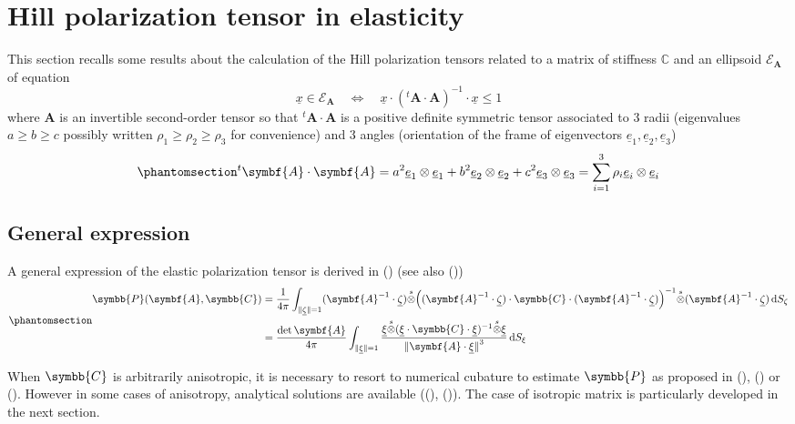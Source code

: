 \documentclass[
  a4paper,
  numbers=noendperiod,
  DIV=12]{scrreprt}
\newcommand{\uu}[1]{{\symbf{{#1}}}}
\newcommand{\uuuu}[1]{{\symbb{{#1}}}}
\newcommand{\uv}[1]{{\underline{{#1}}}}
\newcommand{\trans}[1]{{{}^{t}{#1}}}
\newcommand{\sotimes}{{\stackrel{s}{\otimes}}}
\newcommand{\norm}[1]{{\lVert{{#1}}\rVert}}
\newcommand{\ud}{{\,\mathrm{d}}}
\begin{document}
\chapter{Hill polarization tensor in elasticity}\label{sec-hill_elas}

This section recalls some results about the calculation of the Hill
polarization tensors related to a matrix of stiffness \(\mathbb{C}\) and
an ellipsoid \(\mathcal{E}_{\uu{A}}\) of equation \[
\uv{x}\in\mathcal{E}_{\uu{A}}
\quad\Leftrightarrow\quad
\uv{x}\cdot(\trans{\uu{A}}\cdot\uu{A})^{-1}\cdot\uv{x}\leq 1
\] where \(\uu{A}\) is an invertible second-order tensor so that
\(\trans{\uu{A}}\cdot\uu{A}\) is a positive definite symmetric tensor
associated to 3 radii (eigenvalues \(a\geq b \geq c\) possibly written
\(\rho_1 \geq \rho_2 \geq \rho_3\) for convenience) and 3 angles
(orientation of the frame of eigenvectors
\(\uv{e}_1, \uv{e}_2, \uv{e}_3\))
\begin{equation}\phantomsection\label{eq-ellipsoid}{
\trans{\uu{A}}\cdot\uu{A}=a^2 \uv{e}_1\otimes\uv{e}_1 + b^2 \uv{e}_2\otimes\uv{e}_2 + c^2 \uv{e}_3\otimes\uv{e}_3 = \sum_{i=1}^3 \rho_i \uv{e}_i\otimes\uv{e}_i
}\end{equation}

\section{General expression}\label{general-expression}

A general expression of the elastic polarization tensor is derived in
() (see also
())
\begin{equation}\phantomsection\label{eq-Hill}{\begin{aligned}
\uuuu{P}(\uu{A},\uuuu{C})&=\frac{1}{4\pi}
\int_{\norm{\uv{\zeta}}=1}
(\uu{A}^{-1}\cdot\uv{\zeta})\sotimes
\Big((\uu{A}^{-1}\cdot\uv{\zeta})\cdot\uuuu{C}
\cdot(\uu{A}^{-1}\cdot\uv{\zeta})\Big)^{-1}
\sotimes(\uu{A}^{-1}\cdot\uv{\zeta})
\ud S_\zeta\\
&=
\frac{\det{\uu{A}}}{4\pi}
\int_{\norm{\uv{\xi}}=1}
\frac{\uv{\xi}\sotimes
(\uv{\xi}\cdot\uuuu{C}
\cdot\uv{\xi})^{-1}
\sotimes\uv{\xi}}{\norm{\uu{A}\cdot\uv{\xi}}^3}
\ud S_{\xi}
\end{aligned}}\end{equation}

When \(\uuuu{C}\) is arbitrarily anisotropic, it is necessary to resort
to numerical cubature to estimate \(\uuuu{P}\) as proposed in
(),
() or
(). However in some cases of
anisotropy, analytical solutions are available
((),
()). The
case of isotropic matrix is particularly developed in the next section.
\end{document}
